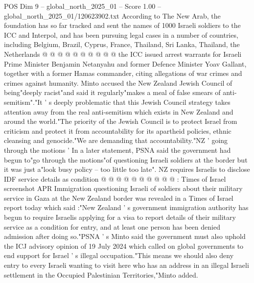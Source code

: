 \begin{textsample}{POS Dim 9 – global\_north\_2025\_01 – Score 1.00 – global\_north\_2025\_01/120623902.txt}
According to The New Arab, the foundation has so far tracked and sent the names of 1000 Israeli soldiers to the ICC and Interpol, and has been pursuing legal cases in a number of countries, including Belgium, Brazil, Cyprus, France, Thailand, Sri Lanka, Thailand, the Netherlands @ @ @ @ @ @ @ @ @ @ the ICC issued arrest warrants for Israeli Prime Minister Benjamin Netanyahu and former Defence Minister Yoav Gallant, together with a former Hamas commander, citing allegations of war crimes and crimes against humanity.
Minto accused the New Zealand Jewish Council of being"deeply racist"and said it regularly"makes a meal of false smears of anti-semitism"."It ' s deeply problematic that this Jewish Council strategy takes attention away from the real anti-semitism which exists in New Zealand and around the world."The priority of the Jewish Council is to protect Israel from criticism and protect it from accountability for its apartheid policies, ethnic cleansing and genocide."We are demanding that accountability."NZ ' going through the motions ' In a later statement, PSNA said the government had begun to"go through the motions"of questioning Israeli soldiers at the border but it was just a"look busy policy -- too little too late".
NZ requires Israelis to disclose IDF service details as condition @ @ @ @ @ @ @ @ @ @ : Times of Israel screenshot APR Immigration questioning Israeli of soldiers about their military service in Gaza at the New Zealand border was revealed in a Times of Israel report today which said :"New Zealand ' s government immigration authority has begun to require Israelis applying for a visa to report details of their military service as a condition for entry, and at least one person has been denied admission after doing so."PSNA ' s Minto said the government must also uphold the ICJ advisory opinion of 19 July 2024 which called on global governments to end support for Israel ' s illegal occupation."This means we should also deny entry to every Israeli wanting to visit here who has an address in an illegal Israeli settlement in the Occupied Palestinian Territories,"Minto added.

\end{textsample}

